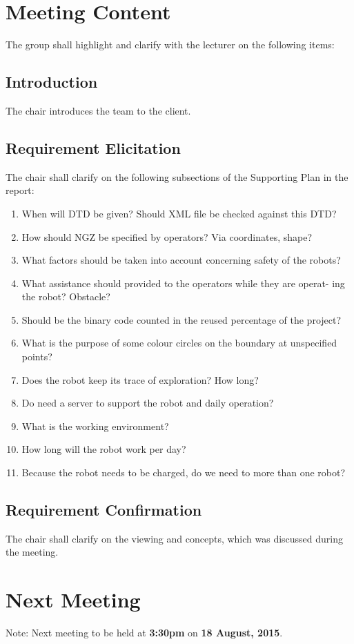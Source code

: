 \documentclass[a4paper] {article}
\begin{document}
	\section{Meeting Content}
	The group shall highlight and clarify with the lecturer on the following items:
	\subsection{Introduction}			
	The chair introduces the team to the client.
	\subsection{Requirement Elicitation}
	The chair shall clarify on the following subsections of the Supporting Plan in the report:
	\begin{enumerate}
	\item When will DTD be given? Should XML file be checked against this DTD?
	\item How should NGZ be specified by operators? Via coordinates, shape?
	\item What factors should be taken into account concerning safety of the robots?
	\item What assistance should provided to the operators while they are operat- ing the robot? Obstacle?
	\item Should be the binary code counted in the reused percentage of the project?
	\item What is the purpose of some colour circles on the boundary at unspecified points?
	\item Does the robot keep its trace of exploration? How long?
	\item Do need a server to support the robot and daily operation?
	\item What is the working environment?
	\item How long will the robot work per day?
	\item Because the robot needs to be charged, do we need to more than one robot?
\end{enumerate}
	\subsection{Requirement Confirmation}
	The chair shall clarify on the viewing and concepts, which was discussed during the meeting.

	\section{Next Meeting}
	Note: Next meeting to be held at \textbf{3:30pm} on \textbf {18 August, 2015}. 
	
\end{document}
